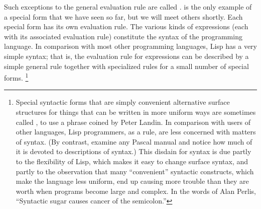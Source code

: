 Such exceptions to the general evaluation rule are called .
 is the only example of a special form that we have seen so far, but we will meet others shortly.
Each special form has its own evaluation rule.
The various kinds of expressions (each with its associated evaluation rule) constitute the syntax of the programming language.
In comparison with most other programming languages, Lisp has a very simple syntax;
that is, the evaluation rule for expressions can be described by a simple general rule together with specialized rules for a small number of special forms.%
\footnote{
	Special syntactic forms that are simply convenient alternative surface structures for things that can be written in more uniform ways are sometimes called , to use a phrase coined by Peter Landin.
	In comparison with users of other languages, Lisp programmers, as a rule, are less concerned with matters of syntax.
	(By contrast, examine any Pascal manual and notice how much of it is devoted to descriptions of syntax.)
	This disdain for syntax is due partly to the flexibility of Lisp, which makes it easy to change surface syntax, and partly to the observation that many “convenient” syntactic constructs, which make the language less uniform, end up causing more trouble than they are worth when programs become large and complex.
	In the words of Alan Perlis,
	“Syntactic sugar causes cancer of the semicolon.”
}
